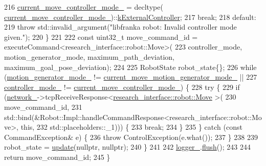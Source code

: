 \begin{DoxyCode}
216       \hyperlink{classfranka_1_1Robot_1_1Impl_ab5d1a7e855dae2453635da08440c375e}{current\_move\_controller\_mode\_} = decltype(
      \hyperlink{classfranka_1_1Robot_1_1Impl_ab5d1a7e855dae2453635da08440c375e}{current\_move\_controller\_mode\_})::\hyperlink{namespaceresearch__interface_1_1robot_a54ee0c8bfefd2ee8a46837ca6d2b1213aae18ec698c6d2260b411166de51e86fe}{kExternalController};
217       \textcolor{keywordflow}{break};
218     \textcolor{keywordflow}{default}:
219       \textcolor{keywordflow}{throw} std::invalid\_argument(\textcolor{stringliteral}{"libfranka robot: Invalid controller mode given."});
220   \}
221 
222   \textcolor{keyword}{const} uint32\_t move\_command\_id = executeCommand<research\_interface::robot::Move>(
223       controller\_mode, motion\_generator\_mode, maximum\_path\_deviation, maximum\_goal\_pose\_deviation);
224 
225   RobotState robot\_state\{\};
226   \textcolor{keywordflow}{while} (\hyperlink{classfranka_1_1Robot_1_1Impl_a209c353b4da1c85d3e633cab161a0d39}{motion\_generator\_mode\_} != 
      \hyperlink{classfranka_1_1Robot_1_1Impl_a2fecb29212c55738e284b2ba8249ad5c}{current\_move\_motion\_generator\_mode\_} ||
227          \hyperlink{classfranka_1_1Robot_1_1Impl_aa435885c35275fc60b8de90832ae24df}{controller\_mode\_} != \hyperlink{classfranka_1_1Robot_1_1Impl_ab5d1a7e855dae2453635da08440c375e}{current\_move\_controller\_mode\_}) \{
228     \textcolor{keywordflow}{try} \{
229       \textcolor{keywordflow}{if} (\hyperlink{classfranka_1_1Robot_1_1Impl_acecf3b158ccd1c2ed7e76971f1e6a192}{network\_}->tcpReceiveResponse<\hyperlink{structresearch__interface_1_1robot_1_1Move}{research\_interface::robot::Move}
      >(
230               move\_command\_id,
231               std::bind(&Robot::Impl::handleCommandResponse<research\_interface::robot::Move>, \textcolor{keyword}{this},
232                         std::placeholders::\_1))) \{
233         \textcolor{keywordflow}{break};
234       \}
235     \} \textcolor{keywordflow}{catch} (\textcolor{keyword}{const} CommandException& e) \{
236       \textcolor{keywordflow}{throw} ControlException(e.what());
237     \}
238 
239     robot\_state = \hyperlink{classfranka_1_1Robot_1_1Impl_a961bcad42d2be61ff56b7004498fa8dd}{update}(\textcolor{keyword}{nullptr}, \textcolor{keyword}{nullptr});
240   \}
241 
242   \hyperlink{classfranka_1_1Robot_1_1Impl_a404078ee04a4786f61d991b71d2dc1ff}{logger\_}.\hyperlink{classfranka_1_1Logger_a44b15a95e25dabe93f797c1d9651fb6e}{flush}();
243 
244   \textcolor{keywordflow}{return} move\_command\_id;
245 \}
\end{DoxyCode}
